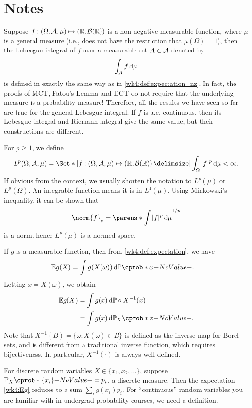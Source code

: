 \documentclass[12pt]{article}
\begin{document}
\section{Notes}

Suppose $f : (\Omega, \mathcal{A}, \mu) \mapsto (\mathbb{R}, \mathcal{B}(\mathbb{R}))$ is a non-negative measurable function, where $\mu$ is a general measure (i.e., does not have the restriction that $\mu(\Omega)=1$), then the Lebesgue integral of $f$ over a measurable set $A \in \mathcal{A}$ denoted by
\begin{align*}
\int_A f \,\mathrm{d}\mu
\end{align*}
is defined in exactly the same way as in \cref{wk4:def:expectation_nz}. In fact, the proofs of MCT, Fatou's Lemma and DCT do not require that the underlying measure is a probability measure! Therefore, all the results we have seen so far are true for the general Lebesgue integral. If $f$ is a.e. continuous, then its Lebesgue integral and Riemann integral give the same value, but their constructions are different. 

For $p\geq 1$, we define
\begin{align*}
L^p(\Omega, \calA, \mu) = \set*[\vert]{ f : (\Omega, \calA, \mu) \mapsto (\Real, \calB(\Real)) \given \int_\Omega |f|^p \ud\mu < \infty}.
\end{align*}
If obvious from the context, we usually shorten the notation to $L^p(\mu)$ or $L^p(\Omega)$. An integrable function means it is in $L^1(\mu)$. Using Minkowski’s inequality, it can be shown that 
\begin{align*}
\norm{f}_p = \parens*{\int |f|^p \ud\mu}^{1/p}
\end{align*}
is a norm, hence $L^p(\mu)$ is a normed space.

If $g$ is a measurable function, then from  \cref{wk4:def:expectation}, we have
\begin{align*}
\E g(X) & =\int g(X(\omega)) \ud\P(\omega).
\end{align*}
Letting $x=X(\omega)$, we obtain
\begin{align}
\E g(X) & = \int g(x) \ud\P \circ X^{-1}(x)\nn
& = \int g(x) \ud\P_{X}(x). \label{wk4:Eg}
\end{align}
Note that $X^{-1}(B)=\{\omega :X(\omega) \in B\}$ is defined as the inverse map for Borel sets, and is different from a traditional inverse function, which requires bijectiveness. In particular, $X^{-1}(\cdot)$ is always well-defined.

For discrete random variables $X \in \{x_1,x_2,\ldots\}$, suppose $\P_X(\{x_i\})=p_i$, a discrete measure. Then the expectation \cref{wk4:Eg} reduces to a sum $\sum_{i}{g(x_i) p_i}$. For ``continuous'' random variables you are familiar with in undergrad probability courses, we need a definition.
\end{document}
